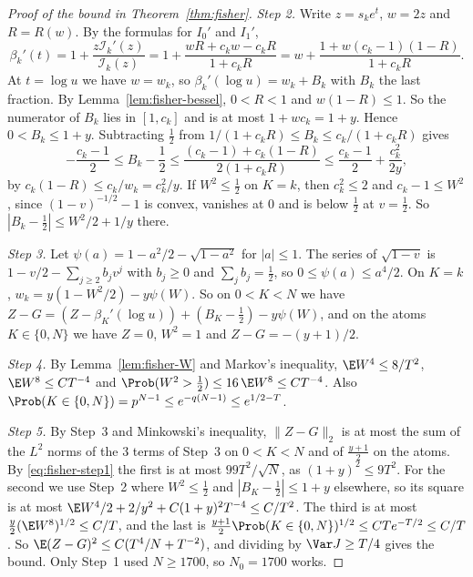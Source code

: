 \begin{proof}[Proof of the bound in Theorem~\ref{thm:fisher}]
\emph{Step 2.} Write $z=s_ke^t$, $w=2z$ and $R=R(w)$. By the formulas for
$I_0'$ and $I_1'$,
\[
 \beta_k'(t)=1+\frac{z\mathcal I_k'(z)}{\mathcal I_k(z)}
 =1+\frac{wR+c_kw-c_kR}{1+c_kR}=w+\frac{1+w(c_k-1)(1-R)}{1+c_kR}.
\]
At $t=\log u$ we have $w=w_k$, so $\beta_k'(\log u)=w_k+B_k$ with $B_k$ the
last fraction. By Lemma~\ref{lem:fisher-bessel}, $0<R<1$ and $w(1-R)\le1$.
So the numerator of $B_k$ lies in $[1,c_k]$ and is at most
$1+wc_k=1+y$. Hence $0<B_k\le1+y$. Subtracting $\frac12$ from
$1/(1+c_kR)\le B_k\le c_k/(1+c_kR)$ gives
\[
 -\frac{c_k-1}2\le B_k-\frac12\le\frac{(c_k-1)+c_k(1-R)}{2(1+c_kR)}
 \le\frac{c_k-1}2+\frac{c_k^2}{2y},
\]
by $c_k(1-R)\le c_k/w_k=c_k^2/y$. If $W^2\le\frac12$ on $K=k$, then
$c_k^2\le2$ and $c_k-1\le W^2$, since $(1-v)^{-1/2}-1$ is convex, vanishes
at $0$ and is below $\frac12$ at $v=\frac12$. So
$|B_k-\frac12|\le W^2/2+1/y$ there.

\emph{Step 3.} Let $\psi(a)=1-a^2/2-\sqrt{1-a^2}$ for $|a|\le1$.
The series of $\sqrt{1-v}$ is $1-v/2-\sum_{j\ge2}b_jv^j$ with $b_j\ge0$ and
$\sum_jb_j=\frac12$, so $0\le\psi(a)\le a^4/2$. On $K=k$,
$w_k=y(1-W^2/2)-y\psi(W)$. So on $0<K<N$ we have
$Z-G=(Z-\beta_K'(\log u))+(B_K-\frac12)-y\psi(W)$, and on the atoms
$K\in\{0,N\}$ we have $Z=0$, $W^2=1$ and $Z-G=-(y+1)/2$.

\emph{Step 4.} By Lemma~\ref{lem:fisher-W} and Markov's inequality,
$\E W^4\le8/T^2$, $\E W^8\le CT^{-4}$ and
$\Prob(W^2>\frac12)\le16\,\E W^8\le CT^{-4}$. Also
$\Prob(K\in\{0,N\})=p^{N-1}\le e^{-q(N-1)}\le e^{1/2-T}$.

\emph{Step 5.} By Step~3 and Minkowski's inequality, $\lVert Z-G\rVert_2$ is
at most the sum of the $L^2$ norms of the 3 terms of Step~3 on $0<K<N$ and of
$\frac{y+1}2$ on the atoms. By \eqref{eq:fisher-step1} the first is at most
$99T^2/\sqrt N$, as $(1+y)^2\le9T^2$. For the second we use Step~2 where
$W^2\le\frac12$ and $|B_K-\frac12|\le1+y$ elsewhere, so its square is at most
$\E W^4/2+2/y^2+C(1+y)^2T^{-4}\le C/T^2$. The third is at most
$\frac y2(\E W^8)^{1/2}\le C/T$, and the last is
$\frac{y+1}2\Prob(K\in\{0,N\})^{1/2}\le CTe^{-T/2}\le C/T$. So
$\E(Z-G)^2\le C(T^4/N+T^{-2})$, and dividing by $\Var J\ge T/4$ gives the
bound. Only Step~1 used $N\ge1700$, so
$N_0=1700$ works.
\end{proof}
